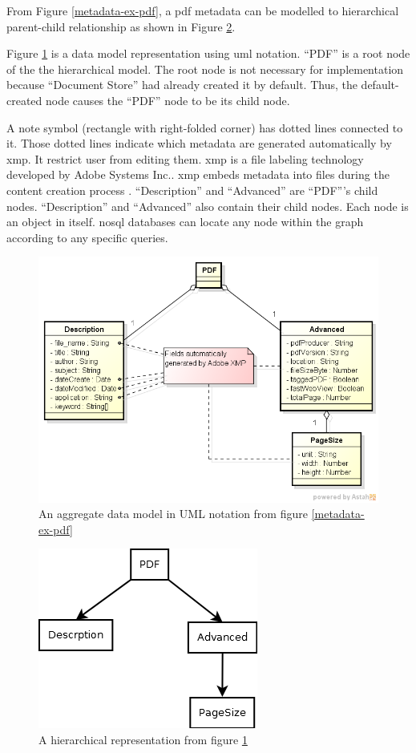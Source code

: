 From Figure \ref{metadata-ex-pdf}, a \gls{pdf} metadata can be modelled to hierarchical parent-child relationship as shown in Figure \ref{nosql-uml-hiarch-repr}.

Figure \ref{nosql-aggregate-uml} is a data model representation using \gls{uml} notation.
\enquote{PDF} is a root node of the the hierarchical model.
The root node is not necessary for implementation because \enquote{Document Store} had already created it by default.
Thus, the default-created node causes the \enquote{PDF} node to be its child node.

A note symbol (rectangle with right-folded corner) has dotted lines connected to it.
Those dotted lines indicate which metadata are generated automatically by \gls{xmp}.
It restrict user from editing them.
\gls{xmp} is a file labeling technology developed by Adobe Systems Inc..
\gls{xmp} embeds metadata into files during the content creation process \cite{adobe-xml}.
\enquote{Description} and \enquote{Advanced} are \enquote{PDF}'s child nodes.
\enquote{Description} and \enquote{Advanced} also contain their child nodes.
Each node is an object in itself.
\gls{nosql} databases can locate any node within the graph according to any specific queries.
\begin{figure}[ht]
	\centering
	\caption{An aggregate data model in UML notation from figure \ref{metadata-ex-pdf}}
	\label{nosql-aggregate-uml}	
	\includegraphics[scale=0.53]{res/bg-knowledge/nosql-nosql-agregate-uml}
\end{figure}
\begin{figure}[ht]
	\centering
	\caption{A hierarchical representation from figure \ref{nosql-aggregate-uml}}
	\label{nosql-uml-hiarch-repr}	
	\includegraphics[scale=0.5]{res/bg-knowledge/nosql-uml-hiarch-repr}
\end{figure}

